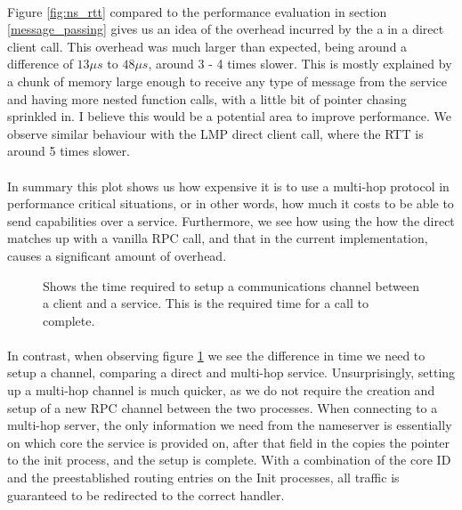 \paragraph{}
Figure \ref{fig:ns_rtt} compared to the performance evaluation in section \ref{message_passing} gives us an idea of the overhead incurred by the a  in a direct client call. This overhead was much larger than expected, being around a difference of $13 \mu s$ to $48 \mu s$, around 3 - 4 times slower. This is mostly explained by  a chunk of memory large enough to receive any type of message from the service and having more nested function calls, with a little bit of pointer chasing sprinkled in. I believe this would be a potential area to improve performance. We observe similar behaviour with the LMP direct client call, where the RTT is around 5 times slower.
\paragraph{}

In summary this plot shows us how expensive it is to use a multi-hop protocol in performance critical situations, or in other words, how much it costs to be able to send capabilities over a service. Furthermore, we see how using the how the direct  matches up with a vanilla RPC call, and that in the current implementation, causes a significant amount of overhead. 




\begin{figure}[ht]
    \centering
    
        \scalebox{0.5}{
            \hspace{-0.20in}
            
        }
    \caption{Shows the time required to setup a communications channel between a client and a service. This is the required time for a  call to complete.}
    \label{fig:lookup_times}
    
\end{figure}




\paragraph{}
In contrast, when observing figure \ref{fig:lookup_times} we see the difference in time we need to setup a channel, comparing a direct and multi-hop service. Unsurprisingly, setting up a multi-hop channel is much quicker, as we do not require the creation and setup of a new RPC channel between the two processes. When connecting to a multi-hop server, the only information we need from the nameserver is essentially on which core the service is provided on, after that  field in the  copies the pointer to the init process, and the setup is complete. With a combination of the core ID and the preestablished routing entries on the Init processes, all traffic is guaranteed to be redirected to the correct handler. 
